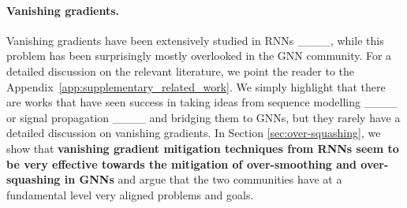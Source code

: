 \paragraph{Vanishing gradients.}
Vanishing gradients have been extensively studied in RNNs ____, while this problem has been surprisingly mostly overlooked in the GNN community. For a detailed discussion on the relevant literature, we point the reader to the Appendix~\ref{app:supplementary_related_work}. We simply highlight that there are works that have seen success in taking ideas from sequence modelling ____ or signal propagation ____ and bridging them to GNNs, but they rarely have a detailed discussion on vanishing gradients. In Section \ref{sec:over-squashing}, we show that \textbf{vanishing gradient mitigation techniques from RNNs seem to be very effective towards the mitigation of over-smoothing and over-squashing in GNNs} and argue that the two communities have at a fundamental level very aligned problems and goals.

\vspace{-0.2cm}
